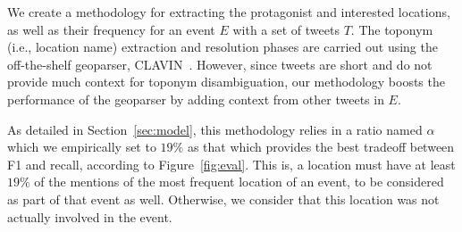 \smallskip
{}
We create a methodology for extracting the protagonist and interested
locations, as well as their frequency for an event $E$
with a set of tweets $T$.  The toponym (i.e., location name)
extraction and resolution phases are carried out using the
off-the-shelf geoparser,
CLAVIN~\cite{clavin}. However, since tweets are short and do
not provide much context for toponym disambiguation, our methodology
boosts the performance of the geoparser by adding context from other
tweets in $E$.

As detailed in Section~\ref{sec:model}, this methodology relies in a
ratio named $\alpha$ which we empirically set to $19\%$
as that which provides the best tradeoff between F1 and
recall, according to Figure~\ref{fig:eval}. This is, a location must have
at least $19\%$ of the mentions of the most frequent location of an event,
to be considered as part of that event as well. Otherwise, we consider
that this location was not actually involved in the event.